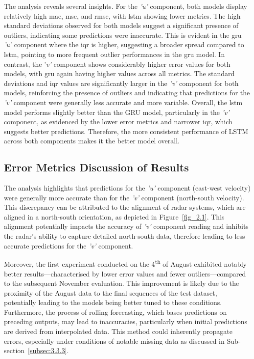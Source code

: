 The analysis reveals several insights. For the \textit{'u'} component, both models display relatively high \acrshort{mae}, \acrshort{mse}, and \acrshort{rmse}, with \acrshort{lstm} showing lower metrics. The high standard deviations observed for both models suggest a significant presence of outliers, indicating some predictions were inaccurate. This is evident in the \acrshort{gru} \textit{'u'} component where the \acrshort{iqr} is higher, suggesting a broader spread compared to \acrshort{lstm}, pointing to more frequent outlier performances in the \acrshort{gru} model. In contrast, the '\textit{v'} component shows considerably higher error values for both models, with \acrshort{gru} again having higher values across all metrics. The standard deviations and \acrshort{iqr} values are significantly larger in the \textit{'v'} component for both models, reinforcing the presence of outliers and indicating that predictions for the \textit{'v'} component were generally less accurate and more variable. Overall, the \acrshort{lstm} model performs slightly better than the GRU model, particularly in the \textit{'v'} component, as evidenced by the lower error metrics and narrower \acrshort{iqr}, which suggests better predictions. Therefore, the more consistent performance of LSTM across both components makes it the better model overall. 

\subsection{Error Metrics Discussion of Results}
\label{subsec:4.1.2}

The analysis highlights that predictions for the \textit{'u'} component (east-west velocity) were generally more accurate than for the \textit{'v'} component (north-south velocity). This discrepancy can be attributed to the alignment of radar systems, which are aligned in a north-south orientation, as depicted in Figure~\ref{fig_2.1}. This alignment potentially impacts the accuracy of \textit{'v'} component reading and inhibits the radar's ability to capture detailed north-south data, therefore leading to less accurate predictions for the \textit{'v'} component. 

Moreover, the first experiment conducted on the 4\textsuperscript{th} of August exhibited notably better results—characterised by lower error values and fewer outliers—compared to the subsequent November evaluation. This improvement is likely due to the proximity of the August data to the final sequences of the test dataset, potentially leading to the models being better tuned to these conditions. Furthermore, the process of rolling forecasting, which bases predictions on preceding outputs, may lead to inaccuracies, particularly when initial predictions are derived from interpolated data. This method could inherently propagate errors, especially under conditions of notable missing data as discussed in Sub-section~\ref{subsec:3.3.3}.

